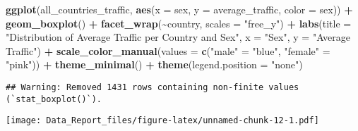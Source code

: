 \documentclass[
]{article}
\newenvironment{Shaded}{\begin{snugshade}}{\end{snugshade}}
\newcommand{\AttributeTok}[1]{\textcolor[rgb]{0.13,0.29,0.53}{#1}}
\newcommand{\FunctionTok}[1]{\textcolor[rgb]{0.13,0.29,0.53}{\textbf{#1}}}
\newcommand{\NormalTok}[1]{#1}
\newcommand{\OtherTok}[1]{\textcolor[rgb]{0.56,0.35,0.01}{#1}}
\newcommand{\SpecialCharTok}[1]{\textcolor[rgb]{0.81,0.36,0.00}{\textbf{#1}}}
\newcommand{\StringTok}[1]{\textcolor[rgb]{0.31,0.60,0.02}{#1}}
\begin{document}
\begin{Shaded}
\begin{Highlighting}[]
\FunctionTok{ggplot}\NormalTok{(all\_countries\_traffic, }\FunctionTok{aes}\NormalTok{(}\AttributeTok{x =}\NormalTok{ sex, }\AttributeTok{y =}\NormalTok{ average\_traffic, }\AttributeTok{color =}\NormalTok{ sex)) }\SpecialCharTok{+}
  \FunctionTok{geom\_boxplot}\NormalTok{() }\SpecialCharTok{+}
  \FunctionTok{facet\_wrap}\NormalTok{(}\SpecialCharTok{\textasciitilde{}}\NormalTok{country, }\AttributeTok{scales =} \StringTok{"free\_y"}\NormalTok{) }\SpecialCharTok{+}
  \FunctionTok{labs}\NormalTok{(}\AttributeTok{title =} \StringTok{"Distribution of Average Traffic per Country and Sex"}\NormalTok{,}
       \AttributeTok{x =} \StringTok{"Sex"}\NormalTok{,}
       \AttributeTok{y =} \StringTok{"Average Traffic"}\NormalTok{) }\SpecialCharTok{+}
  \FunctionTok{scale\_color\_manual}\NormalTok{(}\AttributeTok{values =} \FunctionTok{c}\NormalTok{(}\StringTok{"male"} \OtherTok{=} \StringTok{"blue"}\NormalTok{, }\StringTok{"female"} \OtherTok{=} \StringTok{"pink"}\NormalTok{)) }\SpecialCharTok{+}
  \FunctionTok{theme\_minimal}\NormalTok{() }\SpecialCharTok{+}
  \FunctionTok{theme}\NormalTok{(}\AttributeTok{legend.position =} \StringTok{"none"}\NormalTok{)}
\end{Highlighting}
\end{Shaded}

\begin{verbatim}
## Warning: Removed 1431 rows containing non-finite values (`stat_boxplot()`).
\end{verbatim}

\texttt{[image: Data\_Report\_files/figure-latex/unnamed-chunk-12-1.pdf]}
\end{document}
